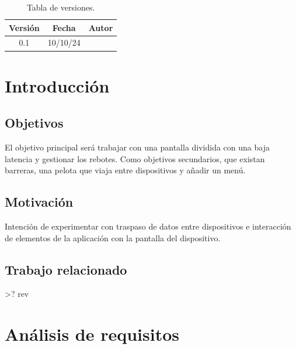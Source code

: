\documentclass[a4paper,openright,12pt]{article}
\begin{document}

\tableofcontents

\vspace{5cm}

\begin{flushright}
\begin{table}[hbtp]
\begin{center}

\caption{Tabla de versiones.}
\label{tabla:versiones}
\small
\vspace{1ex}

\begin{tabular}{|c|c|l|}
\hline
Versión & Fecha & Autor \\
\hline \hline
0.1 & 10/10/24 & \\ \hline

\end{tabular}

\end{center}
\end{table}
\end{flushright}


\newpage
{}


\section{Introducción}\label{cap.introduccion}

\subsection{Objetivos}
El objetivo principal será trabajar con una pantalla dividida con una baja latencia y gestionar los rebotes. Como objetivos secundarios, que existan barreras, una pelota que viaja entre dispositivos y añadir un menú.

\subsection{Motivación}
Intención de experimentar con traspaso de datos entre dispositivos e interacción de elementos de la aplicación con la pantalla del dispositivo.
\subsection{Trabajo relacionado}
>? rev

\section{Análisis de requisitos}
\end{document}
